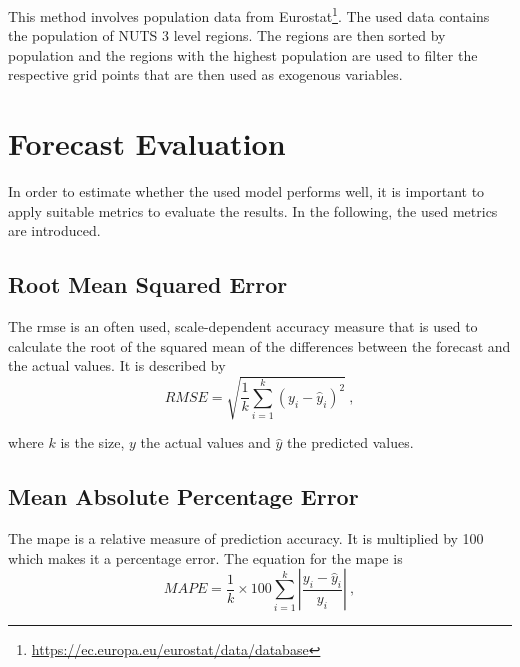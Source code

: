 This method involves population data from Eurostat\footnote{\url{https://ec.europa.eu/eurostat/data/database}}. The used data contains the population of NUTS 3 level regions. The regions are then sorted by population and the regions with the highest population are used to filter the respective grid points that are then used as exogenous variables.\\


\section{Forecast Evaluation}
\label{sec:fceval}

In order to estimate whether the used model performs well, it is important to apply suitable metrics to evaluate the results. In the following, the used metrics are introduced.\\

\subsection{Root Mean Squared Error}

The \gls{rmse} is an often used, scale-dependent accuracy measure that is used to calculate the root of the squared mean of the differences between the forecast and the actual values. It is described by\\

\begin{equation}
RMSE = \sqrt{\frac{1}{k} \sum_{i=1}^{k} (y_i-\hat{y}_i)^2}~,
\label{eq:rmse}
\end{equation}

where $k$ is the size, $y$ the actual values and $\hat{y}$ the predicted values.\\

\subsection{Mean Absolute Percentage Error}

The \gls{mape} is a relative measure of prediction accuracy. It is multiplied by 100 which makes it a percentage error. The equation for the \gls{mape} is\\

\begin{equation}
MAPE = \frac{1}{k}\times 100 \sum_{i=1}^{k} \left|\frac{y_i-\hat{y}_i}{y_i}\right|~,
\label{eq:mape}
\end{equation}

